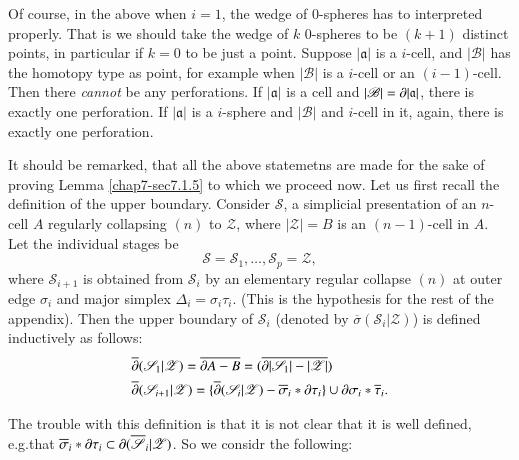 Of course, in the above when $i=1$, the wedge of $0$-spheres has to interpreted properly. That is we should take the wedge of $k$ $0$-spheres to be $(k+1)$ distinct points, in particular if $k=0$ to be just a point. Suppose $|\mathfrak{a}|$ is a $i$-cell, and $|\mathscr{B}|$ has the homotopy type as point, for example when $|\mathscr{B}|$ is a $i$-cell or an $(i-1)$-cell. Then there {\em cannot} be any perforations. If $|\mathfrak{a}|$ is a cell and $|\mathscr{B}|=\partial |\mathfrak{a}|$, there is exactly one perforation. If $|\mathfrak{a}|$ is a $i$-sphere and $|\mathscr{B}|$ and $i$-cell in it, again, there is exactly one perforation.

It should be remarked, that all the above statemetns are made for the sake of proving Lemma \ref{chap7-sec7.1.5} to which we proceed now. Let us first recall the definition of the upper boundary. Consider $\mathscr{S}$, a simplicial presentation of an $n$-cell $A$ regularly collapsing $(n)$ to $\mathscr{Z}$, where $|\mathscr{Z}|=B$ is an $(n-1)$-cell in $A$. Let the individual stages be
$$
\mathscr{S}=\mathscr{S}_{1},\ldots,\mathscr{S}_{p}=\mathscr{Z},
$$
where $\mathscr{S}_{i+1}$ is obtained from $\mathscr{S}_{i}$ by an elementary regular collapse $(n)$ at outer edge $\sigma_{i}$ and major simplex $\Delta_{i}=\sigma_{i}\tau_{i}$. (This is the hypothesis for the rest of the appendix). Then the upper boundary of $\mathscr{S}_{i}$ (denoted by $\overline{\sigma}(\mathscr{S}_{i}|\mathscr{Z})$) is defined inductively as follows:
\begin{align*}
& \overline{\partial}(\mathscr{S}_{1}|\mathscr{Z})=\overline{\partial A-B}=(\overline{\partial |\mathscr{S}_{1}|-|\mathscr{Z}|})\\
& \overline{\partial}(\mathscr{S}_{i+1}|\mathscr{Z})=\{\overline{\partial}(\mathscr{S}_{i}|\mathscr{Z})-\overline{\sigma}_{i}\ast \partial \tau_{i}\}\cup \partial \sigma_{i}\ast \overline{\tau}_{i}.
\end{align*}\pageoriginale

The trouble with this definition is that it is not clear that it is well defined, e.g.\@ that $\overline{\sigma}_{i}\ast\partial\tau_{i}\subset \partial (\overline{\mathscr{S}}_{i}|\mathscr{Z})$. So we considr the following:

